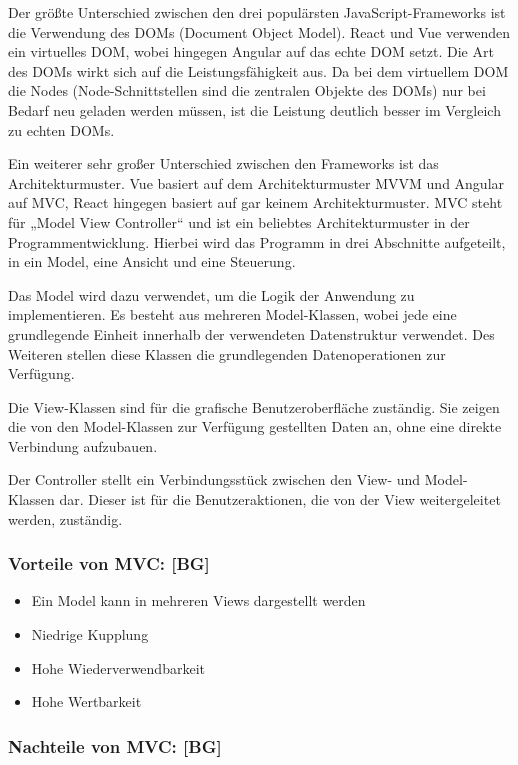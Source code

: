 Der größte Unterschied zwischen den drei populärsten JavaScript-Frameworks ist die Verwendung des DOMs (Document Object Model). React und Vue verwenden ein virtuelles DOM, wobei hingegen Angular auf das echte DOM setzt. Die Art des DOMs wirkt sich auf die Leistungsfähigkeit aus. Da bei dem virtuellem DOM die Nodes (Node-Schnittstellen sind die zentralen Objekte des DOMs) nur bei Bedarf neu geladen werden müssen, ist die Leistung deutlich besser im Vergleich zu echten DOMs.

Ein weiterer sehr großer Unterschied zwischen den Frameworks ist das Architekturmuster. Vue basiert auf dem Architekturmuster MVVM und Angular auf MVC, React hingegen basiert auf gar keinem Architekturmuster.
MVC steht für „Model View Controller“ und ist ein beliebtes Architekturmuster in der Programmentwicklung. Hierbei wird das Programm in drei Abschnitte aufgeteilt, in ein Model, eine Ansicht und eine Steuerung.

Das Model wird dazu verwendet, um die Logik der Anwendung zu implementieren. Es besteht aus mehreren Model-Klassen, wobei jede eine grundlegende Einheit innerhalb der verwendeten Datenstruktur verwendet. Des Weiteren stellen diese Klassen die grundlegenden Datenoperationen zur Verfügung.

Die View-Klassen sind für die grafische Benutzeroberfläche zuständig. Sie zeigen die von den Model-Klassen zur Verfügung gestellten Daten an, ohne eine direkte Verbindung aufzubauen.

Der Controller stellt ein Verbindungsstück zwischen den View- und Model-Klassen dar. Dieser ist für die Benutzeraktionen, die von der View weitergeleitet werden, zuständig.

\subsubsection{Vorteile von MVC: [BG]}

\begin{itemize}
  \item Ein Model kann in mehreren Views dargestellt werden
  \item Niedrige Kupplung
  \item Hohe Wiederverwendbarkeit
  \item Hohe Wertbarkeit
\end{itemize}

\subsubsection{Nachteile von MVC: [BG]}

